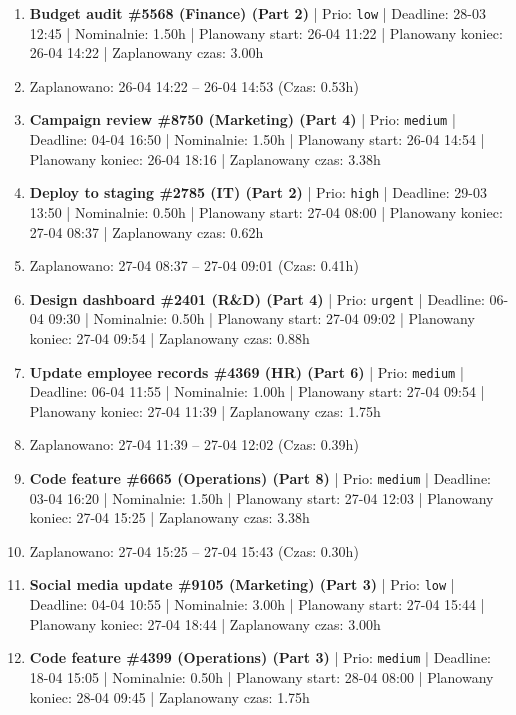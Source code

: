 {\begin{enumerate}
  \item [\textbf{14693}] \textbf{Budget audit \#5568 (Finance) (Part 2)} | Prio: \texttt{low} | Deadline: 28-03 12:45 | Nominalnie: 1.50h | Planowany start: 26-04 11:22 | Planowany koniec: 26-04 14:22 | Zaplanowany czas: 3.00h
  \item [\textbf{PRZERWA}] Zaplanowano: 26-04 14:22 -- 26-04 14:53 (Czas: 0.53h)
  \item [\textbf{14632}] \textbf{Campaign review \#8750 (Marketing) (Part 4)} | Prio: \texttt{medium} | Deadline: 04-04 16:50 | Nominalnie: 1.50h | Planowany start: 26-04 14:54 | Planowany koniec: 26-04 18:16 | Zaplanowany czas: 3.38h
  \item [\textbf{14623}] \textbf{Deploy to staging \#2785 (IT) (Part 2)} | Prio: \texttt{high} | Deadline: 29-03 13:50 | Nominalnie: 0.50h | Planowany start: 27-04 08:00 | Planowany koniec: 27-04 08:37 | Zaplanowany czas: 0.62h
  \item [\textbf{PRZERWA}] Zaplanowano: 27-04 08:37 -- 27-04 09:01 (Czas: 0.41h)
  \item [\textbf{14603}] \textbf{Design dashboard \#2401 (R\&D) (Part 4)} | Prio: \texttt{urgent} | Deadline: 06-04 09:30 | Nominalnie: 0.50h | Planowany start: 27-04 09:02 | Planowany koniec: 27-04 09:54 | Zaplanowany czas: 0.88h
  \item [\textbf{14658}] \textbf{Update employee records \#4369 (HR) (Part 6)} | Prio: \texttt{medium} | Deadline: 06-04 11:55 | Nominalnie: 1.00h | Planowany start: 27-04 09:54 | Planowany koniec: 27-04 11:39 | Zaplanowany czas: 1.75h
  \item [\textbf{PRZERWA}] Zaplanowano: 27-04 11:39 -- 27-04 12:02 (Czas: 0.39h)
  \item [\textbf{14667}] \textbf{Code feature \#6665 (Operations) (Part 8)} | Prio: \texttt{medium} | Deadline: 03-04 16:20 | Nominalnie: 1.50h | Planowany start: 27-04 12:03 | Planowany koniec: 27-04 15:25 | Zaplanowany czas: 3.38h
  \item [\textbf{PRZERWA}] Zaplanowano: 27-04 15:25 -- 27-04 15:43 (Czas: 0.30h)
  \item [\textbf{14698}] \textbf{Social media update \#9105 (Marketing) (Part 3)} | Prio: \texttt{low} | Deadline: 04-04 10:55 | Nominalnie: 3.00h | Planowany start: 27-04 15:44 | Planowany koniec: 27-04 18:44 | Zaplanowany czas: 3.00h
  \item [\textbf{14664}] \textbf{Code feature \#4399 (Operations) (Part 3)} | Prio: \texttt{medium} | Deadline: 18-04 15:05 | Nominalnie: 0.50h | Planowany start: 28-04 08:00 | Planowany koniec: 28-04 09:45 | Zaplanowany czas: 1.75h

\end{enumerate}}
